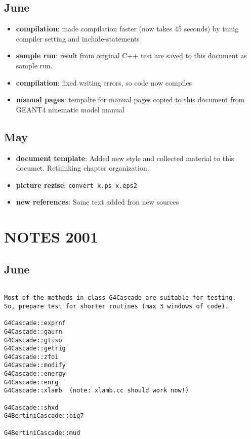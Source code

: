 \subsection{June}
\begin{itemize}
\item {\bf compilation}: made compilation faster (now takes 45
  seconds) by tunig compiler setting and include-statements
\item {\bf sample run}: result from original C++ test are saved to
  this document as sample run.
\item {\bf compilation}: fixed writing errors, so code now compiles
\item {\bf manual pages}: tempalte for manual pages copied to this
  document from GEANT4 ninematic model manual
\end{itemize}

\subsection{May}
\begin{itemize}
\item {\bf document template}: Added new style and collected material
  to this documet. Rethinking chapter organization.
\item {\bf picture rezise}: {\tt convert x.ps x.eps2}
\item {\bf new references}: Some text added fron new sources
\end{itemize}




\section{NOTES 2001}

\subsection{June}
\scriptsize
\begin{verbatim}

Most of the methods in class G4Cascade are suitable for testing.
So, prepare test for shorter routines (max 3 windows of code). 
 
G4Cascade::exprnf
G4Cascade::gaurn
G4Cascade::gtiso
G4Cascade::getrig
G4Cascade::zfoi 
G4Cascade::modify
G4Cascade::energy 
G4Cascade::enrg
G4Cascade::xlamb  (note: xlamb.cc should work now!)

G4Cascade::shxd 
G4BertiniCascade::big7 

G4BertiniCascade::mud

\end{verbatim}
\normalsize

